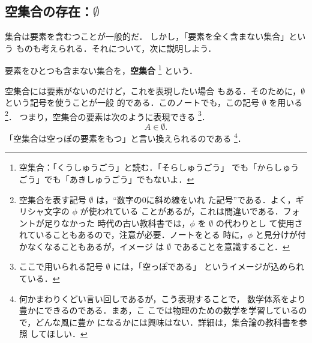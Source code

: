             \subsection{空集合の存在：$\emptyset$}
                集合は要素を含むつことが一般的だ．
                しかし，「要素を全く含まない集合」という
                ものも考えられる．それについて，次に説明しよう．

                要素をひとつも含まない集合を，\textbf{空集合}
                    \footnote{
                        空集合：「くうしゅうごう」と読む．「そらしゅうごう」
                        でも「からしゅうごう」でも「あきしゅうごう」でもないよ．
                    }
                という．

                空集合には要素がないのだけど，これを表現したい場合
                もある．そのために，$\emptyset$ という記号を使うことが一般
                的である．このノートでも，この記号 $\emptyset$ を用いる
                    \footnote{
                        空集合を表す記号 $\emptyset$ は，“数字の0に斜め線をいれ
                        た記号”である．よく，ギリシャ文字の $\phi$ が使われている
                        ことがあるが，これは間違いである．フォントが足りなかった
                        時代の古い教科書では，$\phi$ を $\emptyset$ の代わりとし
                        て使用されていることもあるので，注意が必要．ノートをとる
                        時に，$\phi$ と見分けが付かなくなることもあるが，イメージ
                        は $\emptyset$ であることを意識すること．
                    }．
                つまり，空集合の要素は次のように表現できる
                    \footnote{
                        ここで用いられる記号 $\emptyset$ には，「空っぽである」
                        というイメージが込められている．
                    }．
                    \begin{equation*}
                        A \in \emptyset.
                    \end{equation*}
                「空集合は空っぽの要素をもつ」と言い換えられるのである
                    \footnote{
                        何かまわりくどい言い回しであるが，こう表現することで，
                        数学体系をより豊かにできるのである．まあ，こ
                        こでは物理のための数学を学習しているので，どんな風に豊か
                        になるかには興味はない．詳細は，集合論の教科書を参照
                        してほしい．
                    }．

